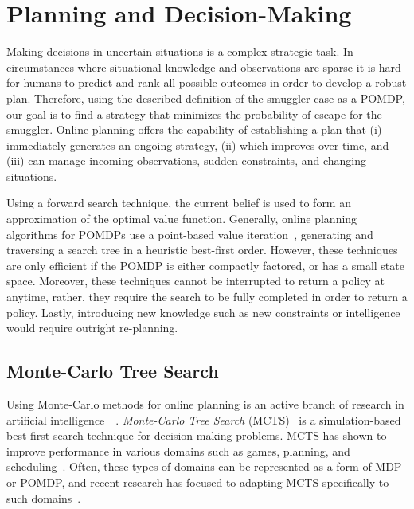 \documentclass[conference]{IEEEtran}
\begin{document}
\section{Planning and Decision-Making}
\label{sec:ma-dec-mak}

Making decisions in uncertain situations is a complex strategic task. In circumstances where situational knowledge and observations are sparse it is hard for humans to predict and rank all possible outcomes in order to develop a robust plan. Therefore, using the described definition of the smuggler case as a POMDP, our goal is to find a strategy that minimizes the probability of escape for the smuggler. Online planning offers the capability of establishing a plan that (i) immediately generates an ongoing strategy, (ii) which improves over time, and (iii) can manage incoming observations, sudden constraints, and changing situations. 

Using a forward search technique, the current belief is used to form an approximation of the optimal value function. Generally, online planning algorithms for POMDPs use a point-based value iteration~\cite{pineau2006anytime,ross2008online}, generating and traversing a search tree in a heuristic best-first order. However, these techniques are only efficient if the POMDP is either compactly factored, or has a small state space. Moreover, these techniques cannot be interrupted to return a policy at anytime, rather, they require the search to be fully completed in order to return a policy. Lastly, introducing new knowledge such as new constraints or intelligence would require outright re-planning.

\subsection{Monte-Carlo Tree Search}
\label{sub:mcts}


Using Monte-Carlo methods for online planning is an active branch of research in artificial intelligence~\cf~\cite{browne2012survey}. {\it Monte-Carlo Tree Search} (MCTS)~\cite{coulom2007efficient,kocsis2006bandit} is a simulation-based best-first search technique for decision-making problems. MCTS has shown to improve performance in various domains such as games, planning, and scheduling~\cite{browne2012survey}. Often, these types of domains can be represented as a form of MDP or POMDP, and recent research has focused to adapting MCTS specifically to such domains~\cite{silver2010monte,Feldman12BRUE}.
\end{document}
